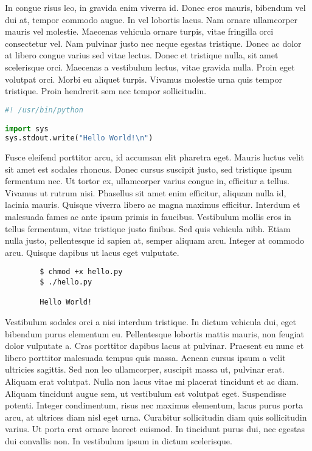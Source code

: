\documentclass{article}
\begin{document}
In congue risus leo, in gravida enim viverra id. Donec eros mauris, bibendum vel dui at, tempor commodo augue. In vel lobortis lacus. Nam ornare ullamcorper mauris vel molestie. Maecenas vehicula ornare turpis, vitae fringilla orci consectetur vel. Nam pulvinar justo nec neque egestas tristique. Donec ac dolor at libero congue varius sed vitae lectus. Donec et tristique nulla, sit amet scelerisque orci. Maecenas a vestibulum lectus, vitae gravida nulla. Proin eget volutpat orci. Morbi eu aliquet turpis. Vivamus molestie urna quis tempor tristique. Proin hendrerit sem nec tempor sollicitudin.

\begin{file}[hello.py]
\begin{lstlisting}[language=Python]
#! /usr/bin/python

import sys
sys.stdout.write("Hello World!\n")
\end{lstlisting}
\end{file}

Fusce eleifend porttitor arcu, id accumsan elit pharetra eget. Mauris luctus velit sit amet est sodales rhoncus. Donec cursus suscipit justo, sed tristique ipsum fermentum nec. Ut tortor ex, ullamcorper varius congue in, efficitur a tellus. Vivamus ut rutrum nisi. Phasellus sit amet enim efficitur, aliquam nulla id, lacinia mauris. Quisque viverra libero ac magna maximus efficitur. Interdum et malesuada fames ac ante ipsum primis in faucibus. Vestibulum mollis eros in tellus fermentum, vitae tristique justo finibus. Sed quis vehicula nibh. Etiam nulla justo, pellentesque id sapien at, semper aliquam arcu. Integer at commodo arcu. Quisque dapibus ut lacus eget vulputate.

\begin{commandline}
	\begin{verbatim}
		$ chmod +x hello.py
		$ ./hello.py

		Hello World!
	\end{verbatim}
\end{commandline}

Vestibulum sodales orci a nisi interdum tristique. In dictum vehicula dui, eget bibendum purus elementum eu. Pellentesque lobortis mattis mauris, non feugiat dolor vulputate a. Cras porttitor dapibus lacus at pulvinar. Praesent eu nunc et libero porttitor malesuada tempus quis massa. Aenean cursus ipsum a velit ultricies sagittis. Sed non leo ullamcorper, suscipit massa ut, pulvinar erat. Aliquam erat volutpat. Nulla non lacus vitae mi placerat tincidunt et ac diam. Aliquam tincidunt augue sem, ut vestibulum est volutpat eget. Suspendisse potenti. Integer condimentum, risus nec maximus elementum, lacus purus porta arcu, at ultrices diam nisl eget urna. Curabitur sollicitudin diam quis sollicitudin varius. Ut porta erat ornare laoreet euismod. In tincidunt purus dui, nec egestas dui convallis non. In vestibulum ipsum in dictum scelerisque.
\end{document}
